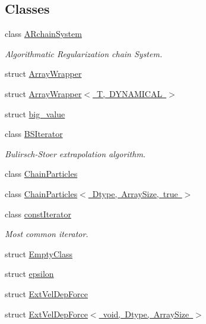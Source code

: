 \subsection*{Classes}
\begin{DoxyCompactItemize}
\item 
class \mbox{\hyperlink{class_space_h_1_1_a_rchain_system}{A\+Rchain\+System}}
\begin{DoxyCompactList}\small\item\em Algorithmatic Regularization chain System. \end{DoxyCompactList}\item 
struct \mbox{\hyperlink{struct_space_h_1_1_array_wrapper}{Array\+Wrapper}}
\item 
struct \mbox{\hyperlink{struct_space_h_1_1_array_wrapper_3_01_t_00_01_d_y_n_a_m_i_c_a_l_01_4}{Array\+Wrapper$<$ T, D\+Y\+N\+A\+M\+I\+C\+A\+L $>$}}
\item 
struct \mbox{\hyperlink{struct_space_h_1_1big__value}{big\+\_\+value}}
\item 
class \mbox{\hyperlink{class_space_h_1_1_b_s_iterator}{B\+S\+Iterator}}
\begin{DoxyCompactList}\small\item\em Bulirsch-\/\+Stoer extrapolation algorithm. \end{DoxyCompactList}\item 
class \mbox{\hyperlink{class_space_h_1_1_chain_particles}{Chain\+Particles}}
\item 
class \mbox{\hyperlink{class_space_h_1_1_chain_particles_3_01_dtype_00_01_array_size_00_01true_01_4}{Chain\+Particles$<$ Dtype, Array\+Size, true $>$}}
\item 
class \mbox{\hyperlink{class_space_h_1_1const_iterator}{const\+Iterator}}
\begin{DoxyCompactList}\small\item\em Most common iterator. \end{DoxyCompactList}\item 
struct \mbox{\hyperlink{struct_space_h_1_1_empty_class}{Empty\+Class}}
\item 
struct \mbox{\hyperlink{struct_space_h_1_1epsilon}{epsilon}}
\item 
struct \mbox{\hyperlink{struct_space_h_1_1_ext_vel_dep_force}{Ext\+Vel\+Dep\+Force}}
\item 
struct \mbox{\hyperlink{struct_space_h_1_1_ext_vel_dep_force_3_01void_00_01_dtype_00_01_array_size_01_4}{Ext\+Vel\+Dep\+Force$<$ void, Dtype, Array\+Size $>$}}
\item 

\end{DoxyCompactItemize}
